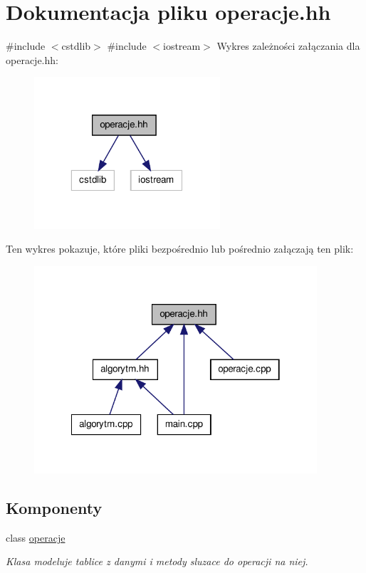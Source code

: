 \hypertarget{operacje_8hh}{\section{\-Dokumentacja pliku operacje.\-hh}
\label{operacje_8hh}
}
{\ttfamily \#include $<$cstdlib$>$}\*
{\ttfamily \#include $<$iostream$>$}\*
\-Wykres zależności załączania dla operacje.\-hh\-:\nopagebreak
\begin{figure}[H]
\begin{center}
\leavevmode
\includegraphics[width=196pt]{operacje_8hh__incl}
\end{center}
\end{figure}
\-Ten wykres pokazuje, które pliki bezpośrednio lub pośrednio załączają ten plik\-:\nopagebreak
\begin{figure}[H]
\begin{center}
\leavevmode
\includegraphics[width=298pt]{operacje_8hh__dep__incl}
\end{center}
\end{figure}
\subsection*{\-Komponenty}
\begin{DoxyCompactItemize}
\item 
class \hyperlink{classoperacje}{operacje}
\begin{DoxyCompactList}\small\item\em \-Klasa modeluje tablice z danymi i metody sluzace do operacji na niej. \end{DoxyCompactList}\end{DoxyCompactItemize}
